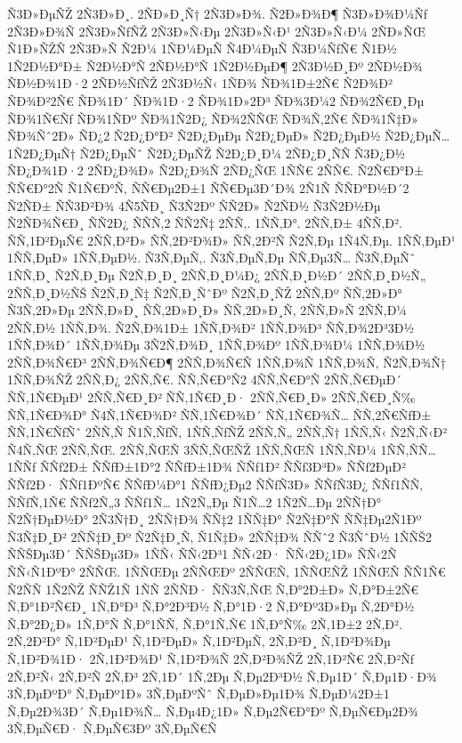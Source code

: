 {Ñ3Ð»ÐµÑŽ
2Ñ3Ð»Ð¸.
2ÑÐ»Ð¸Ñ†
2Ñ3Ð»Ð¾.
Ñ2Ð»Ð¾Ð¶
Ñ3Ð»Ð¾Ð¼Ñƒ
2Ñ3Ð»Ð¾Ñ
2Ñ3Ð»ÑƒÑŽ
2Ñ3Ð»Ñ‹Ðµ
2Ñ3Ð»Ñ‹Ð¹
2Ñ3Ð»Ñ‹Ð¼
2ÑÐ»ÑŒ
Ñ1Ð»ÑŽÑ
2Ñ3Ð»Ñ
Ñ2Ð¼
1ÑÐ¼ÐµÑ
Ñ4Ð¼ÐµÑ
Ñ3Ð¼ÑƒÑ€
Ñ1Ð½
1Ñ2Ð½Ð°Ð±
Ñ2Ð½Ð°Ñ
2ÑÐ½Ð°Ñ
1Ñ2Ð½ÐµÐ¶
2Ñ3Ð½Ð¸Ðº
2ÑÐ½Ð¾
ÑÐ½Ð¾1Ð·2
2ÑÐ½ÑƒÑŽ
2Ñ3Ð½Ñ‹
1ÑÐ¾
ÑÐ¾1Ð±2Ñ€
Ñ2Ð¾Ð²
ÑÐ¾Ð²2Ñ€
ÑÐ¾1Ð´
ÑÐ¾1Ð·2
ÑÐ¾1Ð»2Ð³
ÑÐ¾3Ð¼2
ÑÐ¾2Ñ€Ð¸Ðµ
ÑÐ¾1Ñ€Ñƒ
ÑÐ¾1ÑÐº
ÑÐ¾1Ñ2Ð¿
ÑÐ¾2ÑÑŒ
ÑÐ¾Ñ‚2Ñ€
ÑÐ¾1Ñ‡Ð»
ÑÐ¾Ñˆ2Ð»
ÑÐ¿2
Ñ2Ð¿Ð°Ð²
Ñ2Ð¿ÐµÐµ
Ñ2Ð¿ÐµÐ»
Ñ2Ð¿ÐµÐ½
Ñ2Ð¿ÐµÑ…
1Ñ2Ð¿ÐµÑ†
Ñ2Ð¿ÐµÑˆ
Ñ2Ð¿ÐµÑŽ
Ñ2Ð¿Ð¸Ð¼
2ÑÐ¿Ð¸ÑÑ
Ñ3Ð¿Ð½
ÑÐ¿Ð¾1Ð·2
2ÑÐ¿Ð¾Ð»
Ñ2Ð¿Ð¾Ñ
2ÑÐ¿ÑŒ
1ÑÑ€
2ÑÑ€.
Ñ2Ñ€Ð°Ð±
ÑÑ€Ð°2Ñ
Ñ1Ñ€Ð°Ñ‚
ÑÑ€Ðµ2Ð±1
ÑÑ€Ðµ3Ð´Ð¾
2Ñ1Ñ
ÑÑÐ°Ð½Ð´2
Ñ2ÑÐ±
ÑÑ3Ð²Ð¾
4Ñ5ÑÐ¸
Ñ3Ñ2Ðº
ÑÑ2Ð»
Ñ2ÑÐ½
Ñ3Ñ2Ð½Ðµ
Ñ2ÑÐ¾Ñ€Ð¸
ÑÑ2Ð¿
ÑÑÑ‚2
ÑÑ2Ñ‡
2ÑÑ‚.
1ÑÑ‚Ð°.
2ÑÑ‚Ð±
4ÑÑ‚Ð².
ÑÑ‚1Ð²ÐµÑ€
2ÑÑ‚Ð²Ð»
ÑÑ‚2Ð²Ð¾Ð»
ÑÑ‚2Ð²Ñ
Ñ2Ñ‚Ðµ
1Ñ4Ñ‚Ðµ.
1ÑÑ‚ÐµÐ¹
1ÑÑ‚ÐµÐ»
1ÑÑ‚ÐµÐ½.
Ñ3Ñ‚ÐµÑ‚.
Ñ3Ñ‚ÐµÑ‚Ðµ
ÑÑ‚Ðµ3Ñ…
Ñ3Ñ‚ÐµÑˆ
1ÑÑ‚Ð¸
Ñ2Ñ‚Ð¸Ðµ
Ñ2Ñ‚Ð¸Ð¸
2ÑÑ‚Ð¸Ð¼Ð¿
2ÑÑ‚Ð¸Ð½Ð´
2ÑÑ‚Ð¸Ð½Ñ„
2ÑÑ‚Ð¸Ð½ÑŠ
Ñ2Ñ‚Ð¸Ñ‡
Ñ2Ñ‚Ð¸ÑˆÐº
Ñ2Ñ‚Ð¸ÑŽ
2ÑÑ‚Ðº
ÑÑ‚2Ð»Ð°
Ñ3Ñ‚2Ð»Ðµ
2ÑÑ‚Ð»Ð¸
ÑÑ‚2Ð»Ð¸Ð»
ÑÑ‚2Ð»Ð¸Ñ‚
2ÑÑ‚Ð»Ñ
2ÑÑ‚Ð¼
2ÑÑ‚Ð½
1ÑÑ‚Ð¾.
Ñ2Ñ‚Ð¾1Ð±
1ÑÑ‚Ð¾Ð²
1ÑÑ‚Ð¾Ð³
ÑÑ‚Ð¾2Ð³3Ð½
1ÑÑ‚Ð¾Ð´
1ÑÑ‚Ð¾Ðµ
3Ñ2Ñ‚Ð¾Ð¸
1ÑÑ‚Ð¾Ðº
1ÑÑ‚Ð¾Ð¼
1ÑÑ‚Ð¾Ð½
2ÑÑ‚Ð¾Ñ€Ð³
2ÑÑ‚Ð¾Ñ€Ð¶
2ÑÑ‚Ð¾Ñ€Ñ
1ÑÑ‚Ð¾Ñ
1ÑÑ‚Ð¾Ñ‚
Ñ2Ñ‚Ð¾Ñ†
1ÑÑ‚Ð¾ÑŽ
2ÑÑ‚Ð¿
2ÑÑ‚Ñ€.
ÑÑ‚Ñ€Ð°Ñ2
4ÑÑ‚Ñ€Ð°Ñ
2ÑÑ‚Ñ€ÐµÐ´
ÑÑ‚1Ñ€ÐµÐ¹
2ÑÑ‚Ñ€Ð¸Ð²
ÑÑ‚1Ñ€Ð¸Ð·
2ÑÑ‚Ñ€Ð¸Ð»
2ÑÑ‚Ñ€Ð¸Ñ‰
ÑÑ‚1Ñ€Ð¾Ð°
Ñ4Ñ‚1Ñ€Ð¾Ð²
ÑÑ‚1Ñ€Ð¾Ð´
ÑÑ‚1Ñ€Ð¾Ñ…
ÑÑ‚2Ñ€ÑƒÐ±
ÑÑ‚1Ñ€ÑƒÑˆ
2ÑÑ‚Ñ
Ñ1Ñ‚ÑƒÑ‚
1ÑÑ‚ÑƒÑŽ
2ÑÑ‚Ñ„
2ÑÑ‚Ñ†
1ÑÑ‚Ñ‹
Ñ2Ñ‚Ñ‹Ð²
Ñ4Ñ‚ÑŒ
2ÑÑ‚ÑŒ.
2ÑÑ‚ÑŒÑ
3ÑÑ‚ÑŒÑŽ
1ÑÑ‚ÑŒÑ
1ÑÑ‚ÑÐ¼
1ÑÑ‚ÑÑ…
1ÑÑƒ
ÑÑƒ2Ð±
ÑÑƒÐ±1Ð°2
ÑÑƒÐ±1Ð¾
ÑÑƒ1Ð²
ÑÑƒ3Ð³Ð»
ÑÑƒ2ÐµÐ²
ÑÑƒ2Ð·
ÑÑƒ1ÐºÑ€
ÑÑƒÐ¼Ð°1
ÑÑƒÐ¿Ðµ2
ÑÑƒÑ3Ð»
ÑÑƒÑ3Ð¿
ÑÑƒ1ÑÑ‚
ÑÑƒÑ‚1Ñ€
ÑÑƒ2Ñ„3
ÑÑƒ1Ñ…
1Ñ2Ñ„Ðµ
Ñ1Ñ…2
1Ñ2Ñ…Ðµ
2ÑÑ†Ð°
Ñ2Ñ†ÐµÐ½Ð°
2Ñ3Ñ†Ð¸
2ÑÑ†Ð¾
ÑÑ‡2
1ÑÑ‡Ð°
Ñ2Ñ‡Ð°Ñ
ÑÑ‡Ðµ2Ñ1Ðº
Ñ3Ñ‡Ð¸Ð²
2ÑÑ‡Ð¸Ðº
Ñ2Ñ‡Ð¸Ñ‚
Ñ1Ñ‡Ð»
2ÑÑ‡Ð¾
ÑÑˆ2
Ñ3ÑˆÐ½
1ÑÑŠ2
ÑÑŠÐµ3Ð´
ÑÑŠÐµ3Ð»
1ÑÑ‹
ÑÑ‹2Ð³1
ÑÑ‹2Ð·
ÑÑ‹2Ð¿1Ð»
ÑÑ‹2Ñ
ÑÑ‹Ñ1ÐºÐ°
2ÑÑŒ.
1ÑÑŒÐµ
2ÑÑŒÐº
2ÑÑŒÑ‚
1ÑÑŒÑŽ
1ÑÑŒÑ
ÑÑ1Ñ€
Ñ2ÑÑ
1Ñ2ÑŽ
ÑÑŽ1Ñ
1ÑÑ
2ÑÑÐ·
ÑÑ3Ñ‚ÑŒ
Ñ‚Ð°2Ð±Ð»
Ñ‚Ð°Ð±2Ñ€
Ñ‚Ð°1Ð²Ñ€Ð¸
1Ñ‚Ð°Ð³
Ñ‚Ð°2Ð³Ð½
Ñ‚Ð°1Ð·2
Ñ‚Ð°Ðº3Ð»Ðµ
Ñ‚2Ð°Ð½
Ñ‚Ð°2Ð¿Ð»
1Ñ‚Ð°Ñ
Ñ‚Ð°1ÑÑ‚
Ñ‚Ð°1Ñ‚Ñ€
1Ñ‚Ð°Ñ‰
2Ñ‚1Ð±2
2Ñ‚Ð².
2Ñ‚2Ð²Ð°
Ñ‚1Ð²ÐµÐ¹
Ñ‚1Ð²ÐµÐ»
Ñ‚1Ð²ÐµÑ‚
2Ñ‚Ð²Ð¸
Ñ‚1Ð²Ð¾Ðµ
Ñ‚1Ð²Ð¾1Ð·
2Ñ‚1Ð²Ð¾Ð¹
Ñ‚1Ð²Ð¾Ñ
2Ñ‚Ð²Ð¾ÑŽ
2Ñ‚1Ð²Ñ€
2Ñ‚Ð²Ñƒ
2Ñ‚Ð²Ñ‹
2Ñ‚Ð²Ñ
2Ñ‚Ð³
2Ñ‚1Ð´
1Ñ‚2Ðµ
Ñ‚Ðµ2Ð³Ð½
Ñ‚Ðµ1Ð´
Ñ‚Ðµ1Ð·Ð¾
3Ñ‚ÐµÐºÐ°
Ñ‚ÐµÐº1Ð»
3Ñ‚ÐµÐºÑˆ
Ñ‚ÐµÐ»Ðµ1Ð¾
Ñ‚ÐµÐ¼2Ð±1
Ñ‚Ðµ2Ð¾3Ð´
Ñ‚Ðµ1Ð¾Ñ…
Ñ‚Ðµ4Ð¿1Ð»
Ñ‚Ðµ2Ñ€Ð°Ðº
Ñ‚ÐµÑ€Ðµ2Ð¾
3Ñ‚ÐµÑ€Ð·
Ñ‚ÐµÑ€3Ðº
3Ñ‚ÐµÑ€Ñ
}

